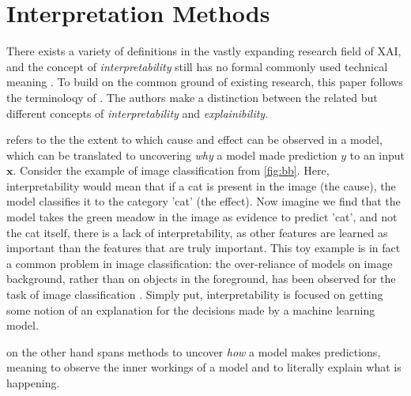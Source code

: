 \section{Interpretation Methods}
\label{sec:interpretation_methods}

There exists a variety of definitions in the vastly expanding research field of XAI, and the concept of \textit{interpretability} still has no formal commonly used technical meaning \cite{lipton2018mythos}. To build on the common ground of existing research, this paper follows the terminoloqy of \cite{arrieta2020explainable}.
The authors make a distinction between the related but different concepts of \textit{interpretability} and \textit{explainibility}.

 refers to the the extent to which cause and effect can be observed in a model, which can be translated to uncovering \textit{why} a model made prediction $y$ to an input $\mathbf{x}$. Consider the example of image classification from \autoref{fig:bb}. Here, interpretability would mean that if a cat is present in the image (the cause), the model classifies it to the category 'cat' (the effect). Now imagine we find that the model takes the green meadow in the image as evidence to predict 'cat', and not the cat itself, there is a lack of interpretability, as other features are learned as important than the features that are truly important. This toy example is in fact a common problem in image classification: the over-reliance of models on image background, rather than on objects in the foreground, has been observed for the task of image classification \cite{xiao2020noise}.%
Simply put, interpretability is focused on getting some notion of an explanation for the decisions made by a machine learning model.

 on the other hand spans methods to uncover \textit{how} a model makes predictions, meaning to observe the inner workings of a model and to literally explain what is happening.

\par\smallskip

